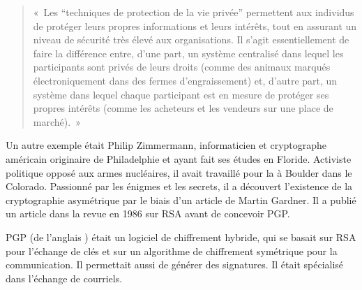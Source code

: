 \begin{quote}
«~Les “techniques de protection de la vie privée” permettent aux individus de protéger leurs propres informations et leurs intérêts, tout en assurant un niveau de sécurité très élevé aux organisations. Il s'agit essentiellement de faire la différence entre, d'une part, un système centralisé dans lequel les participants sont privés de leurs droits (comme des animaux marqués électroniquement dans des fermes d'engraissement) et, d'autre part, un système dans lequel chaque participant est en mesure de protéger ses propres intérêts (comme les acheteurs et les vendeurs sur une place de marché).~»
\end{quote} %

Un autre exemple était Philip Zimmermann, informaticien et cryptographe américain originaire de Philadelphie et ayant fait ses études en Floride. Activiste politique opposé aux armes nucléaires, il avait travaillé pour la  à Boulder dans le Colorado. Passionné par les énigmes et les secrets, il a découvert l'existence de la cryptographie asymétrique par le biais d'un article de Martin Gardner. Il a publié un article dans la revue  en 1986 sur RSA avant de concevoir PGP.

PGP (de l'anglais ) était un logiciel de chiffrement hybride, qui se basait sur RSA pour l'échange de clés et sur un algorithme de chiffrement symétrique pour la communication. Il permettait aussi de générer des signatures. Il était spécialisé dans l'échange de courriels.

